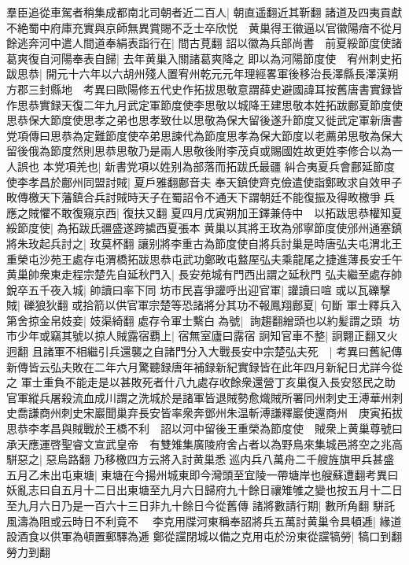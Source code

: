 羣臣追從車駕者稍集成都南北司朝者近二百人|{
	朝直遥翻近其靳翻}
諸道及四夷貢獻不絶蜀中府庫充實與京師無異賞賜不乏士卒欣悦　黄巢得王徽逼以官徽陽瘖不從月餘逃奔河中遣人間道奉絹表詣行在|{
	間古莧翻}
詔以徽為兵部尚書　前夏綏節度使諸葛爽復自河陽奉表自歸|{
	去年黄巢入關諸葛爽降之}
即以為河陽節度使　宥州刺史拓跋思恭|{
	開元十六年以六胡州殘人置宥州乾元元年理經畧軍後移治長澤縣長澤漢朔方郡三封縣地　考異曰歐陽修五代史作拓拔思敬意謂薛史避國諱耳按舊唐書實録皆作思恭實録天復二年九月武定軍節度使李思敬以城降王建思敬本姓拓跋鄜夏節度使思恭保大節度使思孝之弟也思孝致仕以思敬為保大留後遂升節度又徙武定軍新唐書党項傳曰思恭為定難節度使卒弟思諫代為節度思孝為保大節度以老薦弟思敬為保大留後俄為節度然則思恭思敬乃是兩人思敬後附李茂貞或賜國姓故更姓李修合以為一人誤也}
本党項羌也|{
	新書党項以姓别為部落而拓跋氏最疆}
糾合夷夏兵會鄜延節度使李孝昌於鄜州同盟討賊|{
	夏戶雅翻鄜音夫}
奉天鎮使齊克儉遣使詣鄭畋求自效甲子畋傳檄天下藩鎮合兵討賊時天子在蜀詔令不通天下謂朝廷不能復振及得畋檄爭兵應之賊懼不敢復窺京西|{
	復扶又翻}
夏四月戊寅朔加王鐸兼侍中　以拓跋思恭權知夏綏節度使|{
	為拓跋氏疆盛遂跨㨿西夏張本}
黄巢以其將王玫為邠寧節度使邠州通塞鎮將朱玫起兵討之|{
	玫莫杯翻}
讓别將李重古為節度使自將兵討巢是時唐弘夫屯渭北王重榮屯沙苑王處存屯渭橋拓跋思恭屯武功鄭畋屯盩厔弘夫乘龍尾之捷進薄長安壬午黄巢帥衆東走程宗楚先自延秋門入|{
	長安苑城有門西出謂之延秋門}
弘夫繼至處存帥銳卒五千夜入城|{
	帥讀曰率下同}
坊市民喜爭讙呼出迎官軍|{
	讙讀曰喧}
或以瓦礫擊賊|{
	礫狼狄翻}
或拾箭以供官軍宗楚等恐諸將分其功不報鳳翔鄜夏|{
	句斷}
軍士釋兵入第舍掠金帛妓妾|{
	妓渠綺翻}
處存令軍士繫白為號|{
	詢趨翻繒頭也以約髪謂之頭}
坊市少年或竊其號以掠人賊露宿覇上|{
	宿無室廬曰露宿}
詗知官車不整|{
	詗翾正翻又火迥翻}
且諸軍不相繼引兵還襲之自諸門分入大戰長安中宗楚弘夫死　|{
	考異曰舊紀傳新傳皆云弘夫敗在二年六月驚聽録唐年補録新紀實録皆在此年四月新紀日尤詳今從之}
軍士重負不能走是以甚敗死者什八九處存收餘衆還營丁亥巢復入長安怒民之助官軍縱兵屠殺流血成川謂之洗城於是諸軍皆退賊勢愈熾賊所署同州刺史王溥華州刺史喬謙商州刺史宋巖聞巢弃長安皆率衆奔鄧州朱温斬溥謙釋巖使還商州　庚寅拓拔思恭李孝昌與賊戰於王橋不利　詔以河中留後王重榮為節度使　賊衆上黄巢尊號曰承天應運啓聖睿文宣武皇帝　有雙雉集廣陵府舍占者以為野鳥來集城邑將空之兆高駢惡之|{
	惡烏路翻}
乃移檄四方云將入討黄巢悉巡内兵八萬舟二千艘旌旗甲兵甚盛五月乙未出屯東塘|{
	東塘在今揚州城東即今灣頭至宜陵一帶塘岸也艘蘇遭翻考異曰妖亂志曰自五月十二日出東塘至九月六日歸府九十餘日禳雉雊之變也按五月十二日至九月六日乃是一百六十三日非九十餘日今從舊傳}
諸將數請行期|{
	數所角翻}
駢託風濤為阻或云時日不利竟不　李克用牒河東稱奉詔將兵五萬討黄巢令具頓逓|{
	緣道設酒食以供軍為頓置郵驛為逓}
鄭從讜閉城以備之克用屯於汾東從讜犒勞|{
	犒口到翻勞力到翻}
